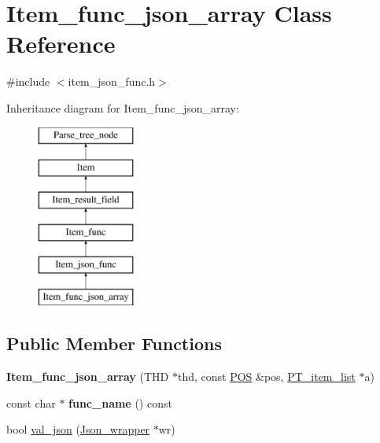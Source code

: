 \hypertarget{classItem__func__json__array}{}\section{Item\+\_\+func\+\_\+json\+\_\+array Class Reference}
\label{classItem__func__json__array}


{\ttfamily \#include $<$item\+\_\+json\+\_\+func.\+h$>$}

Inheritance diagram for Item\+\_\+func\+\_\+json\+\_\+array\+:\begin{figure}[H]
\begin{center}
\leavevmode
\includegraphics[height=6.000000cm]{classItem__func__json__array}
\end{center}
\end{figure}
\subsection*{Public Member Functions}
\begin{DoxyCompactItemize}
\item 
\mbox{\label{classItem__func__json__array_a74c69ba37137acbefbf51d4a2ea8ddbe}} 
{\bfseries Item\+\_\+func\+\_\+json\+\_\+array} (T\+HD $\ast$thd, const \mbox{\hyperlink{structYYLTYPE}{P\+OS}} \&pos, \mbox{\hyperlink{classPT__item__list}{P\+T\+\_\+item\+\_\+list}} $\ast$a)
\item 
\mbox{\label{classItem__func__json__array_a0f9a2d652f54b11322e119f7f23280ce}} 
const char $\ast$ {\bfseries func\+\_\+name} () const
\item 
bool \mbox{\hyperlink{classItem__func__json__array_ae1b5ecc4639fd3d83db1afc5bed37e95}{val\+\_\+json}} (\mbox{\hyperlink{classJson__wrapper}{Json\+\_\+wrapper}} $\ast$wr)
\end{DoxyCompactItemize}
